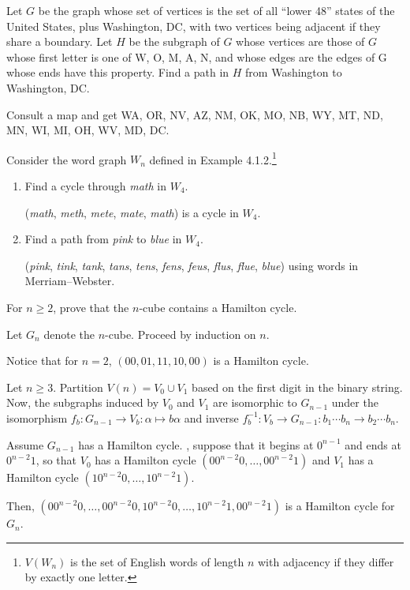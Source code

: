 \documentclass[class=math239,notes,tikz]{agony}
\begin{document}
\setcounter{xca}{3} %

\begin{xca}
  Let $G$ be the graph whose set of vertices is the set of all
  ``lower 48'' states of the United States, plus Washington, DC,
  with two vertices being adjacent if they share a boundary.
  Let $H$ be the subgraph of $G$ whose vertices are those of $G$
  whose first letter is one of W, O, M, A, N,
  and whose edges are the edges of G whose ends have this property.
  Find a path in $H$ from Washington to Washington, DC.
\end{xca}
\begin{sol}
  Consult a map and get WA, OR, NV, AZ, NM, OK, MO, NB, WY, MT, ND, MN, WI, MI, OH, WV, MD, DC.
\end{sol}

\begin{xca}
  Consider the word graph $W_n$ defined in Example 4.1.2.\footnote{
    $V(W_n)$ is the set of English words of length $n$
    with adjacency if they differ by exactly one letter.}
\end{xca}
\begin{enumerate}
  \item Find a cycle through \emph{math} in $W_4$.
        \begin{sol}
          (\emph{math}, \emph{meth}, \emph{mete}, \emph{mate}, \emph{math})
          is a cycle in $W_4$.
        \end{sol}
  \item Find a path from \emph{pink} to \emph{blue} in $W_4$.
        \begin{sol}
          (\emph{pink}, \emph{tink}, \emph{tank}, \emph{tans}, \emph{tens}, \emph{fens}, \emph{feus}, \emph{flus}, \emph{flue}, \emph{blue})
          using words in Merriam--Webster.
        \end{sol}
\end{enumerate}

\begin{xca}
  For $n \geq 2$, prove that the $n$-cube contains a Hamilton cycle.
\end{xca}
\begin{prf}
  Let $G_n$ denote the $n$-cube. Proceed by induction on $n$.

  Notice that for $n = 2$, $(00,01,11,10,00)$ is a Hamilton cycle.

  Let $n \geq 3$.
  Partition $V(n) = V_0 \cup V_1$ based on the first digit in the binary string.
  Now, the subgraphs induced by $V_0$ and $V_1$ are isomorphic to $G_{n-1}$
  under the isomorphism $f_b : G_{n-1} \to V_b : \alpha \mapsto b\alpha$
  and inverse $f^{-1}_b : V_b \to G_{n-1} : b_1\cdots b_n \to b_2 \cdots b_n$.

  Assume $G_{n-1}$ has a Hamilton cycle.
  \WLOG, suppose that it begins at $0^{n-1}$ and ends at $0^{n-2}1$,
  so that $V_0$ has a Hamilton cycle $(00^{n-2}0, \dotsc, 00^{n-2}1)$
  and $V_1$ has a Hamilton cycle $(10^{n-2}0, \dotsc, 10^{n-2}1)$.

  Then, $(00^{n-2}0, \dotsc, 00^{n-2}0, 10^{n-2}0, \dotsc, 10^{n-2}1, 00^{n-2}1)$
  is a Hamilton cycle for $G_n$.
\end{prf}
\end{document}
